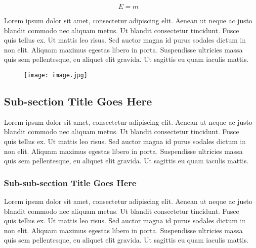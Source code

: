\documentclass{csmagazine}
\begin{document}
\begin{equation}
E=m
\end{equation}

Lorem ipsum dolor sit amet, consectetur adipiscing elit. Aenean ut neque ac justo blandit commodo nec aliquam metus. Ut blandit consectetur tincidunt. Fusce quis tellus ex. Ut mattis leo risus. Sed auctor magna id purus sodales dictum in non elit. Aliquam maximus egestas libero in porta. Suspendisse ultricies massa quis sem pellentesque, eu aliquet elit gravida. Ut sagittis eu quam iaculis mattis.


\begin{figure}[h!]
	\begin{center}	
	\texttt{[image: image.jpg]}
	\end{center}
\end{figure}

\subsection*{Sub-section Title Goes Here}

Lorem ipsum dolor sit amet, consectetur adipiscing elit. Aenean ut neque ac justo blandit commodo nec aliquam metus. Ut blandit consectetur tincidunt. Fusce quis tellus ex. Ut mattis leo risus. Sed auctor magna id purus sodales dictum in non elit. Aliquam maximus egestas libero in porta. Suspendisse ultricies massa quis sem pellentesque, eu aliquet elit gravida. Ut sagittis eu quam iaculis mattis.

\subsubsection*{Sub-sub-section Title Goes Here}

Lorem ipsum dolor sit amet, consectetur adipiscing elit. Aenean ut neque ac justo blandit commodo nec aliquam metus. Ut blandit consectetur tincidunt. Fusce quis tellus ex. Ut mattis leo risus. Sed auctor magna id purus sodales dictum in non elit. Aliquam maximus egestas libero in porta. Suspendisse ultricies massa quis sem pellentesque, eu aliquet elit gravida. Ut sagittis eu quam iaculis mattis.
\end{document}
